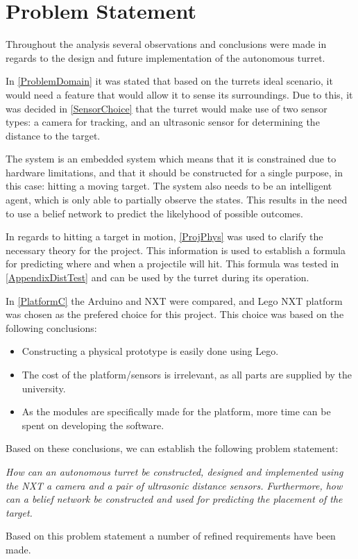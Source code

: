 \chapter{Problem Statement}

Throughout the analysis several observations and conclusions were made in
regards to the design and future implementation of the autonomous turret. 

In \autoref{ProblemDomain} it was stated that based on the turrets ideal
scenario, it would need a feature that would allow it to sense its
surroundings. Due to this, it was decided in \autoref{SensorChoice} that the
turret would make use of two sensor types: a camera for tracking, and an
ultrasonic sensor for determining the distance to the target.\nl

The system is an embedded system which means that it is constrained due to
hardware limitations, and that it should be constructed for a single purpose,
in this case: hitting a moving target. The system also needs to be an
intelligent agent, which is only able to partially observe the states. This
results in the need to use a belief network to predict the likelyhood of
possible outcomes.

In regards to hitting a target in motion, \autoref{ProjPhys} was used to
clarify the necessary theory for the project. This information is used to
establish a formula for predicting where and when a projectile will hit. This
formula was tested in \autoref{AppendixDistTest} and can be used by the turret
during its operation.\nl

In \autoref{PlatformC} the Arduino and NXT were compared, and Lego NXT
platform was chosen as the prefered choice for this project. This choice was
based on the following conclusions:
\begin{itemize}
  \item Constructing a physical prototype is easily done using Lego.
  \item The cost of the platform/sensors is irrelevant, as all parts are
  supplied by the university.
  \item As the modules are specifically made for the platform, more time can be
  spent on developing the software.
\end{itemize}

Based on these conclusions, we can establish the following
problem statement:

\begin{center}
\begin{minipage}{0.8\linewidth}
\textit{How can an autonomous turret be constructed, designed and implemented
using the NXT a camera and a pair of ultrasonic distance sensors. Furthermore,
how can a belief network be constructed and used for predicting the placement
of the target.}
\end{minipage}
\end{center}

Based on this problem statement a number of refined requirements have been made.
